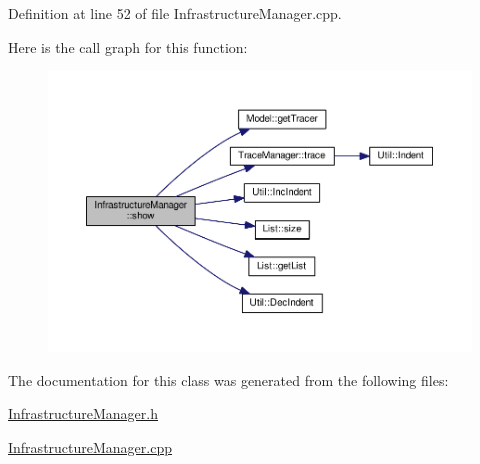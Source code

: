 Definition at line 52 of file Infrastructure\-Manager.\-cpp.



Here is the call graph for this function\-:
\nopagebreak
\begin{figure}[H]
\begin{center}
\leavevmode
\includegraphics[width=350pt]{class_infrastructure_manager_a8e10fe1a6a40ce020b1b63232dbb05cd_cgraph}
\end{center}
\end{figure}




The documentation for this class was generated from the following files\-:\begin{DoxyCompactItemize}
\item 
\hyperlink{_infrastructure_manager_8h}{Infrastructure\-Manager.\-h}\item 
\hyperlink{_infrastructure_manager_8cpp}{Infrastructure\-Manager.\-cpp}\end{DoxyCompactItemize}
